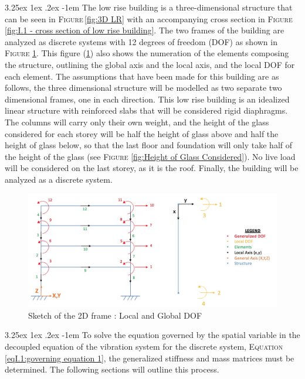 \documentclass[11pt,a4paper,titlepage]{report}
\makeatletter
\renewcommand\paragraph{\@startsection{paragraph}{5}{\z@}%
  {3.25ex \@plus1ex \@minus.2ex}%
  {-1em}%
  {\normalfont\normalsize\bfseries}}
\makeatother
\begin{document}
\paragraph{}The low rise building is a three-dimensional structure that can be seen in \textsc{Figure}\,\ref{fig:3D LR} with an accompanying cross section in \textsc{Figure}\,\ref{fig:I.1 - cross section of low rise building}. The two frames of the building are analyzed as discrete systems with 12 degrees of freedom (DOF) as shown in \textsc{Figure} \ref{fig: I.1 - DOF}. This figure (\ref{fig: I.1 - DOF}) also shows the numeration of the elements composing the structure, outlining the global axis and the local axis, and the local DOF for each element. The assumptions that have been made for this building are as follows, the three dimensional structure will be modelled as two separate two dimensional frames, one in each direction. This low rise building is an idealized linear structure with reinforced slabs that will be considered rigid diaphragms. The columns will carry only their own weight, and the height of the glass considered for each storey will be half the height of glass above and half the height of glass below, so that the last floor and foundation will only take half of the height of the glass (see \textsc{Figure} \ref{fig:Height of Glass Considered}). No live load will be considered on the last storey, as it is the roof. Finally, the building will be analyzed as a discrete system.
\begin{figure} [h]
    \centering
    \includegraphics[width=14cm]{Local_and_global_DOF.jpeg}
    \caption{Sketch of the 2D frame : Local and Global DOF}
    \label{fig: I.1 - DOF}
\end{figure}
\paragraph{}To solve the equation governed by the spatial variable in the decoupled equation of the vibration system for the discrete system, \textsc{Equation}\,\eqref{eqI.1:governing equation 1}, the generalized stiffness and mass matrices must be determined. The following sections will outline this process. 
\end{document}
